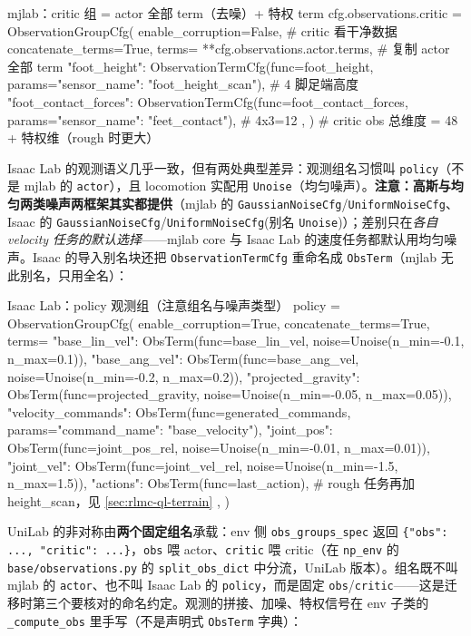 \begin{codebox}[Python]{mjlab：critic 组 = actor 全部 term（去噪）+ 特权 term}
cfg.observations.critic = ObservationGroupCfg(
    enable_corruption=False,   # critic 看干净数据
    concatenate_terms=True,
    terms={
        **cfg.observations.actor.terms,                  # 复制 actor 全部 term
        "foot_height":         ObservationTermCfg(func=foot_height,
                                       params={"sensor_name": "foot_height_scan"}),    # 4 脚足端高度
        "foot_contact_forces": ObservationTermCfg(func=foot_contact_forces,
                                       params={"sensor_name": "feet_contact"}),        # 4x3=12
    },
)   # critic obs 总维度 = 48 + 特权维（rough 时更大）
\end{codebox}

Isaac Lab 的观测语义几乎一致，但有两处典型差异：观测组名习惯叫 \verb|policy|（不是 mjlab 的 \verb|actor|），且 locomotion 实配用 \verb|Unoise|（均匀噪声）。\textbf{注意：高斯与均匀两类噪声两框架其实都提供}（mjlab 的 \verb|GaussianNoiseCfg|/\verb|UniformNoiseCfg|、Isaac 的 \verb|GaussianNoiseCfg|/\verb|UniformNoiseCfg|(别名 \verb|Unoise|)）；差别只在\emph{各自 velocity 任务的默认选择}——mjlab core 与 Isaac Lab 的速度任务都默认用均匀噪声。Isaac 的导入别名块还把 \verb|ObservationTermCfg| 重命名成 \verb|ObsTerm|（mjlab 无此别名，只用全名）：

\begin{codebox}[Python]{Isaac Lab：policy 观测组（注意组名与噪声类型）}
policy = ObservationGroupCfg(
    enable_corruption=True, concatenate_terms=True,
    terms={
        "base_lin_vel":      ObsTerm(func=base_lin_vel, noise=Unoise(n_min=-0.1, n_max=0.1)),
        "base_ang_vel":      ObsTerm(func=base_ang_vel, noise=Unoise(n_min=-0.2, n_max=0.2)),
        "projected_gravity": ObsTerm(func=projected_gravity, noise=Unoise(n_min=-0.05, n_max=0.05)),
        "velocity_commands": ObsTerm(func=generated_commands, params={"command_name": "base_velocity"}),
        "joint_pos":         ObsTerm(func=joint_pos_rel, noise=Unoise(n_min=-0.01, n_max=0.01)),
        "joint_vel":         ObsTerm(func=joint_vel_rel, noise=Unoise(n_min=-1.5, n_max=1.5)),
        "actions":           ObsTerm(func=last_action),
        # rough 任务再加 height_scan，见 \cref{sec:rlmc-ql-terrain}
    },
)
\end{codebox}

UniLab 的非对称由\textbf{两个固定组名}承载：env 侧 \verb|obs_groups_spec| 返回 \verb|{"obs": ..., "critic": ...}|，\verb|obs| 喂 actor、\verb|critic| 喂 critic（在 \verb|np_env| 的 \verb|base/observations.py| 的 \verb|split_obs_dict| 中分流，UniLab 版本）。组名既不叫 mjlab 的 \verb|actor|、也不叫 Isaac Lab 的 \verb|policy|，而是固定 \verb|obs|/\verb|critic|——这是迁移时第三个要核对的命名约定。观测的拼接、加噪、特权信号在 env 子类的 \verb|_compute_obs| 里手写（不是声明式 \verb|ObsTerm| 字典）：

